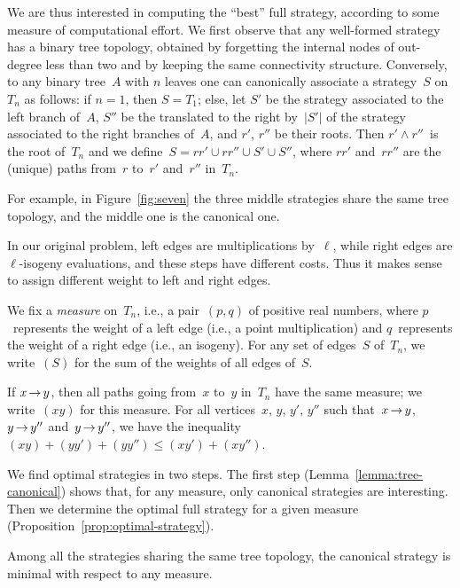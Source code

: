 \documentclass[jmc]{degruyter-journal-a}
\theoremstyle{definition}
\def\abs#1{\left|#1\right|}
\begin{document}
We are thus interested in computing the ``best'' full strategy,
according to some measure of computational effort. We first observe
that any well-formed strategy has a binary tree topology, obtained by
forgetting the internal nodes of out-degree less than two and by
keeping the same connectivity structure. Conversely, to any binary
tree~$A$ with $n$ leaves one can canonically associate a strategy~$S$
on $T_n$ as follows: if $n = 1$, then $S = T_1$; else, let $S'$ be the
strategy associated to the left branch of~$A$, $S''$ be the translated
to the right by~$\abs{S'}$ of the strategy associated to the right
branches of~$A$, and $r'$, $r''$ be their roots. Then $r' \wedge
r''$~is the root of~$T_n$ and we define~$S = rr' \cup rr'' \cup S'
\cup S''$, where $rr'$ and~$rr''$ are the (unique) paths from~$r$
to~$r'$ and~$r''$ in~$T_n$.

For example, in Figure~\ref{fig:seven} the three middle
strategies share the same tree topology, and the middle one is the
canonical one.

In our original problem, left edges are multiplications by~$\ell$, while
right edges are $\ell$-isogeny evaluations, and these steps have
different costs. Thus it makes sense to assign different weight to left
and right edges.

We fix a \emph{measure} on~$T_n$, i.e., a pair~$(p,q)$ of
positive real numbers, where $p$~represents the weight of a left edge
(i.e., a point multiplication) and $q$~represents the weight of a
right edge (i.e., an isogeny). For any set of edges~$S$ of~$T_n$,
we write~$(S)$ for the sum of the weights of all edges of~$S$.

If $x \mathop{\rightarrow} y$, then all paths going from~$x$ to~$y$ in~$T_n$ have
the same measure; we write~$(xy)$ for this measure. For all vertices~$x$,
$y$, $y'$, $y''$ such that~$x \mathop{\rightarrow} y$, $y \mathop{\rightarrow} y''$ and~$y \mathop{\rightarrow}
y''$, we have the inequality $(xy) + (yy') + (yy'') \leq
(xy') + (xy'')$.

We find optimal strategies in two steps. The first step
(Lemma~\ref{lemma:tree-canonical}) shows that, for any measure, only
canonical strategies are interesting. Then we determine the optimal
full strategy for a given measure
(Proposition~\ref{prop:optimal-strategy}).

\begin{lemma}\label{lemma:tree-canonical}
  Among all the strategies sharing the same tree topology, the
  canonical strategy is minimal with respect to any measure.

\end{lemma}
\end{document}
